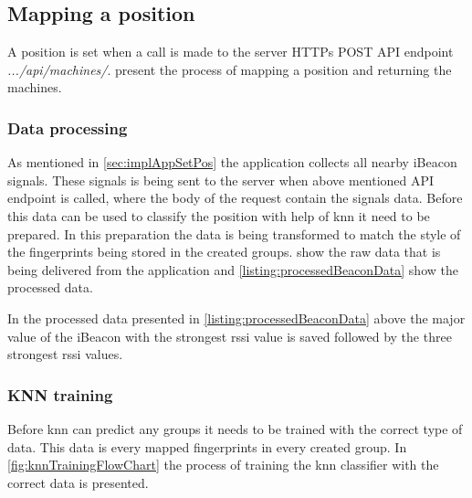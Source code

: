 \subsection{Mapping a position}\label{sec:implServerSetPos}
A position is set when a call is made to the server HTTPs POST API endpoint \textit{.../api/machines/}.
 present the process of mapping a position and returning the machines.


\subsubsection{Data processing}\label{sec:implServerSetPosDataProcessing}
As mentioned in \cref{sec:implAppSetPos} the application collects all nearby iBeacon signals.
These signals is being sent to the server when above mentioned API endpoint is called, where the body of the request contain the signals data.
Before this data can be used to classify the position with help of \acrfull{knn} it need to be prepared.
In this preparation the data is being transformed to match the style of the fingerprints being stored in the created groups.
 show the raw data that is being delivered from the application and \cref{listing:processedBeaconData} show the processed data.



In the processed data presented in \cref{listing:processedBeaconData} above the major value of the iBeacon with the strongest \acrshort{rssi} value is saved followed by the three strongest \acrshort{rssi} values.


\subsubsection{KNN training}\label{sec:implServerSetPosKnnTraining}

Before \acrshort{knn} can predict any groups it needs to be trained with the correct type of data.
This data is every mapped fingerprints in every created group.
In \cref{fig:knnTrainingFlowChart} the process of training the \acrshort{knn} classifier with the correct data is presented.

